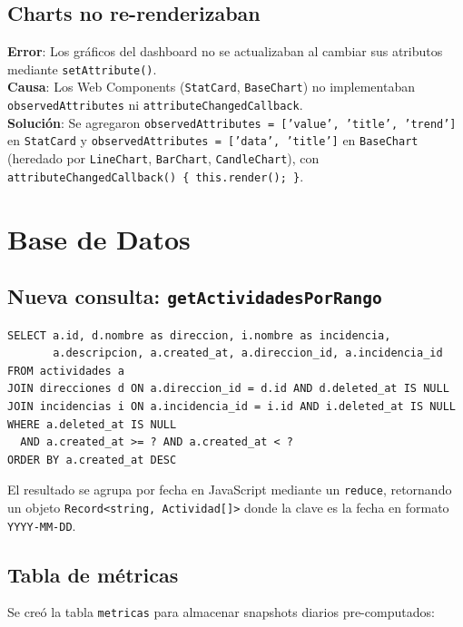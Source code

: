 \documentclass[12pt,a4paper]{article}
\begin{document}
\subsection{Charts no re-renderizaban}

\textbf{Error}: Los gráficos del dashboard no se actualizaban al cambiar sus atributos mediante \texttt{setAttribute()}.\\
\textbf{Causa}: Los Web Components (\texttt{StatCard}, \texttt{BaseChart}) no implementaban \texttt{observedAttributes} ni \texttt{attributeChangedCallback}.\\
\textbf{Solución}: Se agregaron \texttt{observedAttributes = ['value', 'title', 'trend']} en \texttt{StatCard} y \texttt{observedAttributes = ['data', 'title']} en \texttt{BaseChart} (heredado por \texttt{LineChart}, \texttt{BarChart}, \texttt{CandleChart}), con \texttt{attributeChangedCallback() \{ this.render(); \}}.

\section{Base de Datos}

\subsection{Nueva consulta: \texttt{getActividadesPorRango}}

\begin{lstlisting}[caption={Query de actividades por rango de fechas}, label=lst:db-range]
SELECT a.id, d.nombre as direccion, i.nombre as incidencia,
       a.descripcion, a.created_at, a.direccion_id, a.incidencia_id
FROM actividades a
JOIN direcciones d ON a.direccion_id = d.id AND d.deleted_at IS NULL
JOIN incidencias i ON a.incidencia_id = i.id AND i.deleted_at IS NULL
WHERE a.deleted_at IS NULL
  AND a.created_at >= ? AND a.created_at < ?
ORDER BY a.created_at DESC
\end{lstlisting}

El resultado se agrupa por fecha en JavaScript mediante un \texttt{reduce}, retornando un objeto \texttt{Record<string, Actividad[]>} donde la clave es la fecha en formato \texttt{YYYY-MM-DD}.

\subsection{Tabla de métricas}

Se creó la tabla \texttt{metricas} para almacenar snapshots diarios pre-computados:
\end{document}
